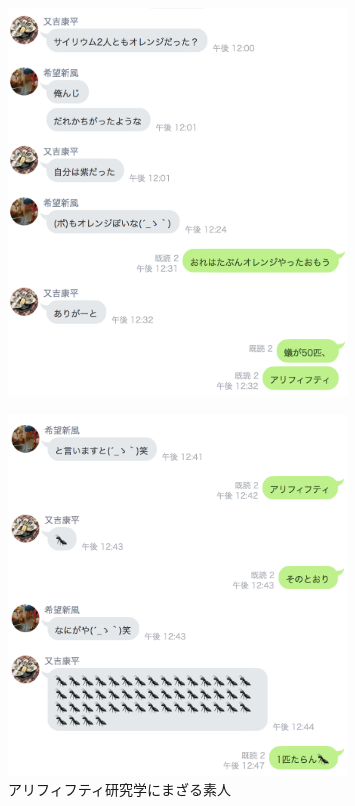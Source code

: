 \begin{figure}[htbp]
 \begin{minipage}{0.5\hsize}
  \begin{center}
\includegraphics[width=0.8\textwidth]{./section/Appendix/figures/ari50_1.png}
  \end{center}
  \label{fig:one}
 \end{minipage}
 \begin{minipage}{0.5\hsize}
  \begin{center}
\includegraphics[width=0.8\textwidth]{./section/Appendix/figures/ari50_2.png}
  \end{center}
 \end{minipage}
 \caption{アリフィフティ研究学にまざる素人}
  \label{fig:Ari50}
\end{figure}

